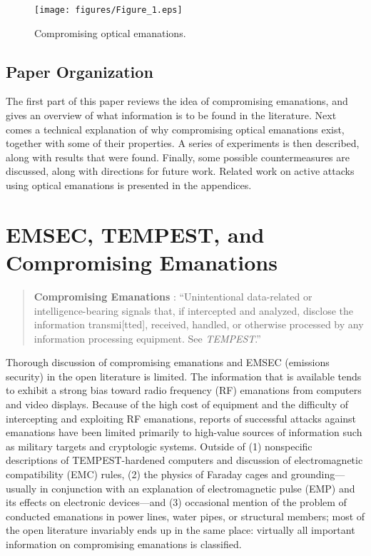\documentclass{acmtrans2e}
\begin{document}
\begin{figure}
\centering
\texttt{[image: figures/Figure\_1.eps]}
\caption{Compromising optical emanations.}
\label{example_of_optical_emanations_figure}
\end{figure}

\subsection{Paper Organization}

The first part of this paper reviews the idea of compromising 
emanations, and gives an overview of what information is to be found in 
the literature.  Next comes a technical explanation of why compromising 
optical emanations exist, together with some of their properties.  A series of 
experiments is then described, along with results that were found.  
Finally, some possible countermeasures are discussed, along with 
directions for future work. Related work on active attacks using optical 
emanations is presented in the appendices.

\section{EMSEC, TEMPEST, and Compromising Emanations}

\begin{quotation}
{\bf Compromising Emanations} \cite{ncsc_tg_004}: ``Unintentional
data-related or intelligence-bearing signals that, if 
intercepted and analyzed, disclose the information transmi[tted],
received, handled, or otherwise processed by any information processing 
equipment. See {\it TEMPEST}.''
\end{quotation}

Thorough discussion of compromising emanations and EMSEC (emissions
security) in the open literature is limited.  The information that is 
available tends to exhibit a strong bias toward radio frequency 
(RF) emanations from computers and video displays.  Because of the high 
cost of equipment and the difficulty of intercepting and exploiting RF 
emanations, reports of successful attacks against emanations 
have been limited primarily to high-value sources of information such 
as military targets and cryptologic systems.  Outside of (1) nonspecific 
descriptions of TEMPEST-hardened computers and discussion of 
electromagnetic compatibility (EMC) rules, (2) the physics of Faraday cages
and grounding---usually in conjunction with an explanation of
electromagnetic pulse (EMP) and its effects on electronic devices---and
(3) occasional mention of the 
problem of conducted emanations in power lines, water pipes, or
structural members;
most of the open literature invariably ends up in the same place: virtually
all important information on compromising emanations is classified.
\end{document}
